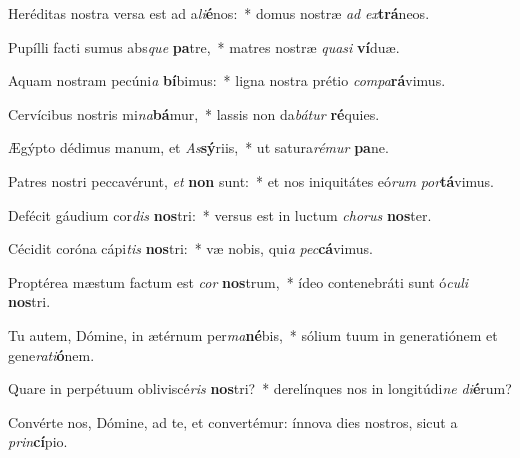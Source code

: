 \item Heréditas nostra versa est ad a\textit{li}\textbf{é}nos:~* domus nostræ \textit{ad} \textit{ex}\textbf{trá}neos.
\item Pupílli facti sumus abs\textit{que} \textbf{pa}tre,~* matres nostræ \textit{qua}\textit{si} \textbf{ví}duæ.
\item Aquam nostram pecúni\textit{a} \textbf{bí}bimus:~* ligna nostra prétio \textit{com}\textit{pa}\textbf{rá}vimus.
\item Cervícibus nostris mi\textit{na}\textbf{bá}mur,~* lassis non da\textit{bá}\textit{tur} \textbf{ré}quies.
\item Ægýpto dédimus manum, et \textit{As}\textbf{sý}riis,~* ut satura\textit{ré}\textit{mur} \textbf{pa}ne.
\item Patres nostri peccavérunt, \textit{et} \textbf{non} sunt:~* et nos iniquitátes eó\textit{rum} \textit{por}\textbf{tá}vimus.
\item Defécit gáudium cor\textit{dis} \textbf{nos}tri:~* versus est in luctum \textit{cho}\textit{rus} \textbf{nos}ter.
\item Cécidit coróna cápi\textit{tis} \textbf{nos}tri:~* væ nobis, qui\textit{a} \textit{pec}\textbf{cá}vimus.
\item Proptérea mæstum factum est \textit{cor} \textbf{nos}trum,~* ídeo contenebráti sunt ó\textit{cu}\textit{li} \textbf{nos}tri.
\item Tu autem, Dómine, in ætérnum per\textit{ma}\textbf{né}bis,~* sólium tuum in generatiónem et gene\textit{ra}\textit{ti}\textbf{ó}nem.
\item Quare in perpétuum obliviscé\textit{ris} \textbf{nos}tri?~* derelínques nos in longitúdi\textit{ne} \textit{di}\textbf{é}rum?
\item Convérte nos, Dómine, ad te, et convertémur: ínnova dies nostros, sicut a \textit{prin}\textbf{cí}pio.
